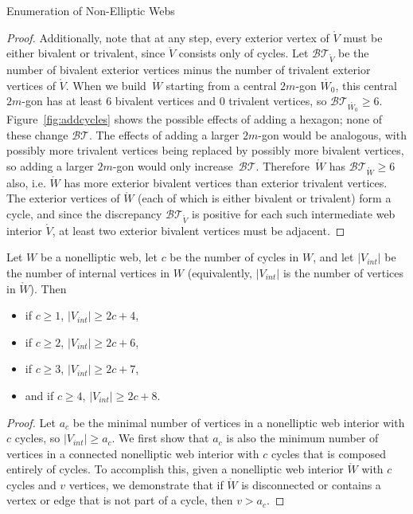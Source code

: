 \begin{subsection}{Enumeration of Non-Elliptic Webs}
\begin{proof}
Additionally, note that at any step, every exterior vertex of $\mathring{V}$ must be either bivalent or trivalent, since $\mathring{V}$ consists only of cycles. Let $\mathcal{BT}_{\mathring{V}}$ be the number of bivalent exterior vertices minus the number of trivalent exterior vertices of $\mathring{V}$. When we build~$\mathring{W}$ starting from a central $2m$-gon $\mathring{W_0}$, this central
$2m$-gon has at least 6 bivalent vertices and 0 trivalent vertices, so $\mathcal{BT}_{\mathring{W_0}}\geq 6$. Figure~\ref{fig:addcycles} shows the possible effects of adding a hexagon; none of these change $\mathcal{BT}$. The effects of adding a larger $2m$-gon would be analogous, with possibly more trivalent vertices being replaced by possibly more bivalent vertices, so adding a larger $2m$-gon would only increase~$\mathcal{BT}$. Therefore~$\mathring{W}$ has $\mathcal{BT}_{\mathring{W}}\geq 6$ also, i.e. $\mathring{W}$ has more exterior bivalent vertices than exterior trivalent vertices. The exterior vertices of $\mathring{W}$ (each of which is either bivalent or trivalent) form a cycle, and since the discrepancy $\mathcal{BT}_{\mathring{V}}$ is positive for each such intermediate web interior $\mathring{V}$, at least two exterior bivalent vertices must be adjacent.
\end{proof}

\begin{prop}\label{prop:minvertices}
Let $W$ be a nonelliptic web, let $c$ be the number of cycles in $W$, and let $|V_{int}|$ be the number of internal vertices in $W$ (equivalently, $|V_{int}|$ is the number of vertices in $\mathring{W}$). Then
\begin{itemize}
    \item if $c \geq 1$, $|V_{int}| \geq 2c+4$,
    \item if $c \geq 2$, $|V_{int}| \geq 2c+6$,
    \item if $c \geq 3$, $|V_{int}| \geq 2c+7$,
    \item and if $c \geq 4$, $|V_{int}| \geq 2c + 8$. 
\end{itemize}
\end{prop}
\begin{proof}
Let $a_c$ be the minimal number of vertices in a nonelliptic web interior with $c$ cycles, so $|V_{int}| \geq a_c$. We first show that $a_c$ is also the minimum number of vertices in a connected nonelliptic web interior with $c$ cycles that is composed entirely of cycles. To accomplish this, given a nonelliptic web interior $\mathring{W}$ with $c$ cycles and $v$ vertices, we demonstrate that if $\mathring{W}$ is disconnected or contains a vertex or edge that is not part of a cycle, then $v>a_c$.


\end{proof}
\end{subsection}
